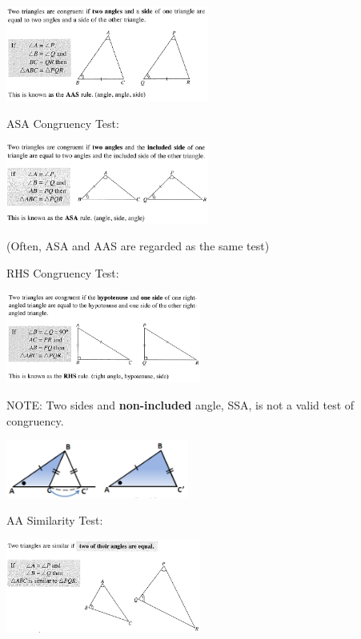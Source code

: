 \documentclass[twocolumn]{article}
\begin{document}
\includegraphics[width=0.5\textwidth]{92.png}

\bigskip 

\noindent 
ASA Congruency Test:

\includegraphics[width=0.5\textwidth]{93.png}

\bigskip 

\noindent
(Often, ASA and AAS are regarded as the same test)

\bigskip 

\noindent 
RHS Congruency Test:

\includegraphics[width=0.48\textwidth]{94.png}

\bigskip 

\noindent 
NOTE: Two sides and {\bf non-included} angle, SSA, is not a valid test of congruency.

\includegraphics[width=0.45\textwidth]{95.png}

\bigskip 

\noindent 
AA Similarity Test:

\includegraphics[width=0.48\textwidth]{96.png}
\end{document}
